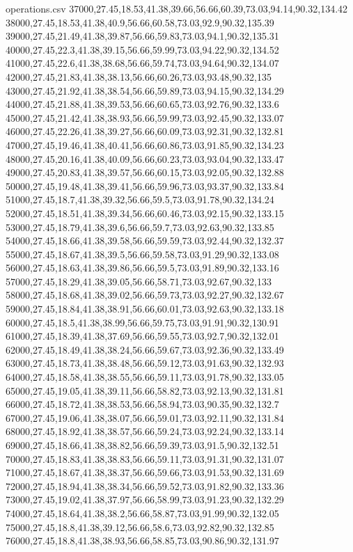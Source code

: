 \documentclass[pdflatex,sn-mathphys-num]{sn-jnl}%
\theoremstyle{thmstyleone}%
\theoremstyle{thmstyletwo}%
\theoremstyle{thmstylethree}%
\begin{document}
\begin{filecontents*}{operations.csv}
37000,27.45,18.53,41.38,39.66,56.66,60.39,73.03,94.14,90.32,134.42
38000,27.45,18.53,41.38,40.9,56.66,60.58,73.03,92.9,90.32,135.39
39000,27.45,21.49,41.38,39.87,56.66,59.83,73.03,94.1,90.32,135.31
40000,27.45,22.3,41.38,39.15,56.66,59.99,73.03,94.22,90.32,134.52
41000,27.45,22.6,41.38,38.68,56.66,59.74,73.03,94.64,90.32,134.07
42000,27.45,21.83,41.38,38.13,56.66,60.26,73.03,93.48,90.32,135
43000,27.45,21.92,41.38,38.54,56.66,59.89,73.03,94.15,90.32,134.29
44000,27.45,21.88,41.38,39.53,56.66,60.65,73.03,92.76,90.32,133.6
45000,27.45,21.42,41.38,38.93,56.66,59.99,73.03,92.45,90.32,133.07
46000,27.45,22.26,41.38,39.27,56.66,60.09,73.03,92.31,90.32,132.81
47000,27.45,19.46,41.38,40.41,56.66,60.86,73.03,91.85,90.32,134.23
48000,27.45,20.16,41.38,40.09,56.66,60.23,73.03,93.04,90.32,133.47
49000,27.45,20.83,41.38,39.57,56.66,60.15,73.03,92.05,90.32,132.88
50000,27.45,19.48,41.38,39.41,56.66,59.96,73.03,93.37,90.32,133.84
51000,27.45,18.7,41.38,39.32,56.66,59.5,73.03,91.78,90.32,134.24
52000,27.45,18.51,41.38,39.34,56.66,60.46,73.03,92.15,90.32,133.15
53000,27.45,18.79,41.38,39.6,56.66,59.7,73.03,92.63,90.32,133.85
54000,27.45,18.66,41.38,39.58,56.66,59.59,73.03,92.44,90.32,132.37
55000,27.45,18.67,41.38,39.5,56.66,59.58,73.03,91.29,90.32,133.08
56000,27.45,18.63,41.38,39.86,56.66,59.5,73.03,91.89,90.32,133.16
57000,27.45,18.29,41.38,39.05,56.66,58.71,73.03,92.67,90.32,133
58000,27.45,18.68,41.38,39.02,56.66,59.73,73.03,92.27,90.32,132.67
59000,27.45,18.84,41.38,38.91,56.66,60.01,73.03,92.63,90.32,133.18
60000,27.45,18.5,41.38,38.99,56.66,59.75,73.03,91.91,90.32,130.91
61000,27.45,18.39,41.38,37.69,56.66,59.55,73.03,92.7,90.32,132.01
62000,27.45,18.49,41.38,38.24,56.66,59.67,73.03,92.36,90.32,133.49
63000,27.45,18.73,41.38,38.48,56.66,59.12,73.03,91.63,90.32,132.93
64000,27.45,18.58,41.38,38.55,56.66,59.11,73.03,91.78,90.32,133.05
65000,27.45,19.05,41.38,39.11,56.66,58.82,73.03,92.13,90.32,131.81
66000,27.45,18.72,41.38,38.53,56.66,58.94,73.03,90.35,90.32,132.7
67000,27.45,19.06,41.38,38.07,56.66,59.01,73.03,92.11,90.32,131.84
68000,27.45,18.92,41.38,38.57,56.66,59.24,73.03,92.24,90.32,133.14
69000,27.45,18.66,41.38,38.82,56.66,59.39,73.03,91.5,90.32,132.51
70000,27.45,18.83,41.38,38.83,56.66,59.11,73.03,91.31,90.32,131.07
71000,27.45,18.67,41.38,38.37,56.66,59.66,73.03,91.53,90.32,131.69
72000,27.45,18.94,41.38,38.34,56.66,59.52,73.03,91.82,90.32,133.36
73000,27.45,19.02,41.38,37.97,56.66,58.99,73.03,91.23,90.32,132.29
74000,27.45,18.64,41.38,38.2,56.66,58.87,73.03,91.99,90.32,132.05
75000,27.45,18.8,41.38,39.12,56.66,58.6,73.03,92.82,90.32,132.85
76000,27.45,18.8,41.38,38.93,56.66,58.85,73.03,90.86,90.32,131.97

\end{filecontents*}
\end{document}
